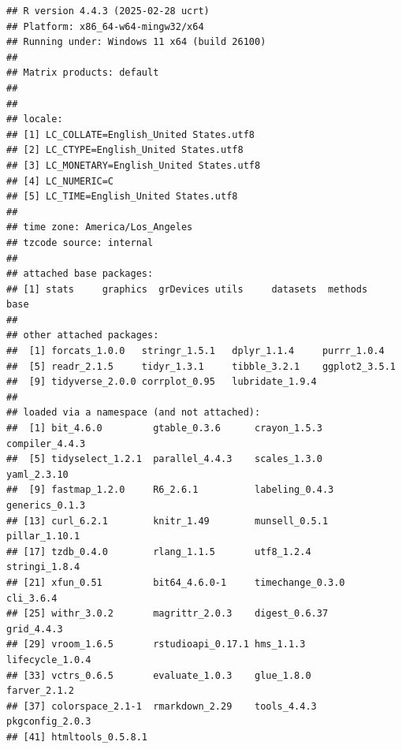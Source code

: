 \documentclass[
]{article}
\begin{document}
\begin{verbatim}
## R version 4.4.3 (2025-02-28 ucrt)
## Platform: x86_64-w64-mingw32/x64
## Running under: Windows 11 x64 (build 26100)
## 
## Matrix products: default
## 
## 
## locale:
## [1] LC_COLLATE=English_United States.utf8 
## [2] LC_CTYPE=English_United States.utf8   
## [3] LC_MONETARY=English_United States.utf8
## [4] LC_NUMERIC=C                          
## [5] LC_TIME=English_United States.utf8    
## 
## time zone: America/Los_Angeles
## tzcode source: internal
## 
## attached base packages:
## [1] stats     graphics  grDevices utils     datasets  methods   base     
## 
## other attached packages:
##  [1] forcats_1.0.0   stringr_1.5.1   dplyr_1.1.4     purrr_1.0.4    
##  [5] readr_2.1.5     tidyr_1.3.1     tibble_3.2.1    ggplot2_3.5.1  
##  [9] tidyverse_2.0.0 corrplot_0.95   lubridate_1.9.4
## 
## loaded via a namespace (and not attached):
##  [1] bit_4.6.0         gtable_0.3.6      crayon_1.5.3      compiler_4.4.3   
##  [5] tidyselect_1.2.1  parallel_4.4.3    scales_1.3.0      yaml_2.3.10      
##  [9] fastmap_1.2.0     R6_2.6.1          labeling_0.4.3    generics_0.1.3   
## [13] curl_6.2.1        knitr_1.49        munsell_0.5.1     pillar_1.10.1    
## [17] tzdb_0.4.0        rlang_1.1.5       utf8_1.2.4        stringi_1.8.4    
## [21] xfun_0.51         bit64_4.6.0-1     timechange_0.3.0  cli_3.6.4        
## [25] withr_3.0.2       magrittr_2.0.3    digest_0.6.37     grid_4.4.3       
## [29] vroom_1.6.5       rstudioapi_0.17.1 hms_1.1.3         lifecycle_1.0.4  
## [33] vctrs_0.6.5       evaluate_1.0.3    glue_1.8.0        farver_2.1.2     
## [37] colorspace_2.1-1  rmarkdown_2.29    tools_4.4.3       pkgconfig_2.0.3  
## [41] htmltools_0.5.8.1
\end{verbatim}
\end{document}
